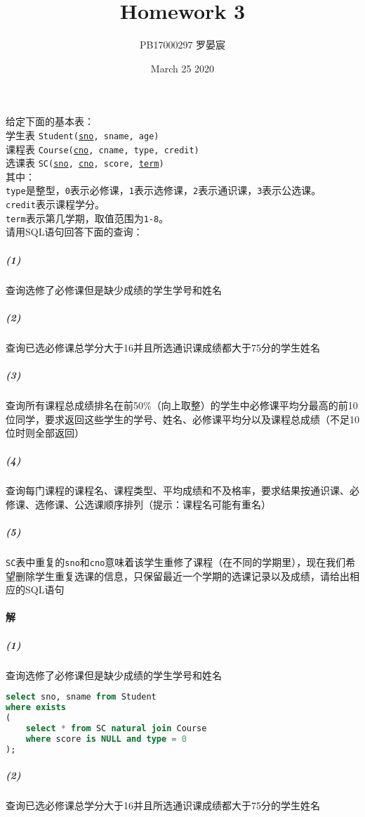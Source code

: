 \documentclass{article}
\title{Homework 3}
\author{PB17000297 罗晏宸}
\date{March 25 2020}
\makeatletter
\renewcommand{\section}{\@startsection{section}{1}{0mm}
                                {-5ex plus -.5ex minus -.2ex}
                                {3ex plus .2ex}
                                {\normalfont\large\bfseries}}
\makeatother
\begin{document}
\maketitle

\section{给定下面的基本表：
  \protect\\ \indent 学生表 \texttt{Student(\uline{sno}, sname, age)}
  \protect\\ \indent 课程表 \texttt{Course(\uline{cno}, cname, type, credit)}
  \protect\\ \indent 选课表 \texttt{SC(\uline{sno}, \uline{cno}, score, \uline{term})}
  \protect\\ 其中：
  \protect\\ \indent \texttt{type}是整型，\texttt{0}表示必修课，\texttt{1}表示选修课，\texttt{2}表示通识课，\texttt{3}表示公选课。
  \protect\\ \indent \texttt{credit}表示课程学分。
  \protect\\ \indent \texttt{term}表示第几学期，取值范围为\texttt{1-8}。
  \protect\\ 请用SQL语句回答下面的查询：}
\subparagraph{(1)} 查询选修了必修课但是缺少成绩的学生学号和姓名
\subparagraph{(2)} 查询已选必修课总学分大于16并且所选通识课成绩都大于75分的学生姓名
\subparagraph{(3)} 查询所有课程总成绩排名在前50\%（向上取整）的学生中必修课平均分最高的前10位同学，要求返回这些学生的学号、姓名、必修课平均分以及课程总成绩（不足10位时则全部返回）
\subparagraph{(4)} 查询每门课程的课程名、课程类型、平均成绩和不及格率，要求结果按通识课、必修课、选修课、公选课顺序排列（提示：课程名可能有重名）
\subparagraph{(5)} \texttt{SC}表中重复的\texttt{sno}和\texttt{cno}意味着该学生重修了课程（在不同的学期里），现在我们希望删除学生重复选课的信息，只保留最近一个学期的选课记录以及成绩，请给出相应的SQL语句

\paragraph{解}
\subparagraph{(1)} 查询选修了必修课但是缺少成绩的学生学号和姓名

\begin{lstlisting}[language = SQL]
select sno, sname from Student
where exists
(
    select * from SC natural join Course
    where score is NULL and type = 0
);
\end{lstlisting}

\subparagraph{(2)} 查询已选必修课总学分大于16并且所选通识课成绩都大于75分的学生姓名
\end{document}
